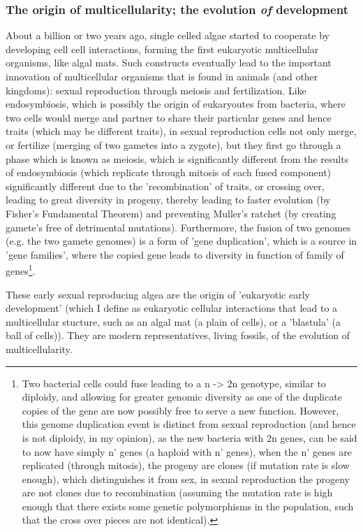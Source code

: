 \subsubsection{The origin of multicellularity; the evolution \textit{of} development}
About a billion or two years ago, single celled algae started to cooperate by developing cell cell interactions, forming the first eukaryotic multicellular  organisms, like algal mats.  Such constructs eventually lead to the important innovation of multicellular organisms that is found in animals (and other kingdoms): sexual reproduction through meiosis and fertilization.  Like endosymbiosis, which is possibly the origin of eukaryoutes from bacteria, where two cells would merge and partner to share their particular genes and hence traits (which may be different traits), in sexual reproduction cells not only merge, or fertilize (merging of two gametes into a zygote), but they first go through a phase which is known as meiosis, which is significantly different from the results of endosymbiosis (which replicate through mitosis of each fused component) significantly different due to the 'recombination' of traits, or crossing over, leading to great diversity in progeny, thereby leading to faster evolution (by Fisher's Fundamental Theorem) and preventing Muller's ratchet (by creating gamete's free of detrimental mutations).  Furthermore, the fusion of two genomes (e.g. the two gamete genomes) is a form of 'gene duplication', which is a source in 'gene families', where the copied gene leads to diversity in function of family of genes\footnote{Two bacterial cells could fuse leading to a n -> 2n genotype, similar to diploidy, and allowing for greater genomic diversity as one of the duplicate copies of the gene are now possibly free to serve a new function.  However, this genome duplication event is distinct from sexual reproduction (and hence is not diploidy, in my opinion), as the new bacteria with 2n genes, can be said to now have simply n' genes (a haploid with n' genes), when the n' genes are replicated (through mitosis), the progeny are clones (if mutation rate is slow enough), which distinguishes it from sex, in sexual reproduction the progeny are not clones due to recombination (assuming the mutation rate is high enough that there exists some genetic polymorphisms in the population, such that the cross over pieces are not identical).}.  

These early sexual reproducing algea are the origin of 'eukaryotic early development' (which I define as eukaryotic cellular interactions that lead to a multicellular stucture, such as an algal mat (a plain of cells), or a 'blastula' (a ball of cells)\cite{pmid7579526}).  They are modern representatives, living fossils, of the evolution of multicellularity.  

